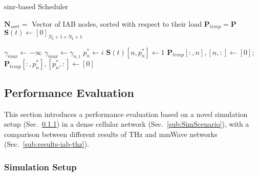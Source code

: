 \begin{algorithm}
\small
	\caption{\gls{sinr}-based Scheduler} 
	\begin{algorithmic}
        \State $\bm{N}_{sort} =$ Vector of IAB nodes, sorted with respect to their load 
        \State $\bm{P}_{temp} =  \bm{P} $
        \State $\bm{S} (t) \gets [0]_{N_{\mathrm{I}} + 1 \times N_{\mathrm{I}} + 1} $
        
            \State $\gamma_{max} \gets - \infty$
                    \State $\gamma_{max} \gets \gamma_{n, i}$
                    \State $p_n^{*} \gets i$
                \EndIf
		    \EndFor
		\State $\bm{S} (t) [n, p_n^{*}] \gets 1$
        \State $\bm{P}_{temp} [:, n], [n, :] \gets [0] $; $\bm{P}_{temp} [:, p_n^{*}], [p_n^{*}, :] \gets [0] $
	\EndFor
	\end{algorithmic} 
\label{algo:sinr}
\end{algorithm}




\subsection{Performance Evaluation}
\label{sec:PerfEval}
This section introduces a performance evaluation based on a novel simulation setup (Sec.~\ref{sec:SimSetup}) in a dense cellular network (Sec.~\ref{sub:SimScenario}), with a comparison between different results of THz and mmWave networks (Sec.~\ref{sub:results-iab-thz}).

\subsubsection{Simulation Setup}
\label{sec:SimSetup}


